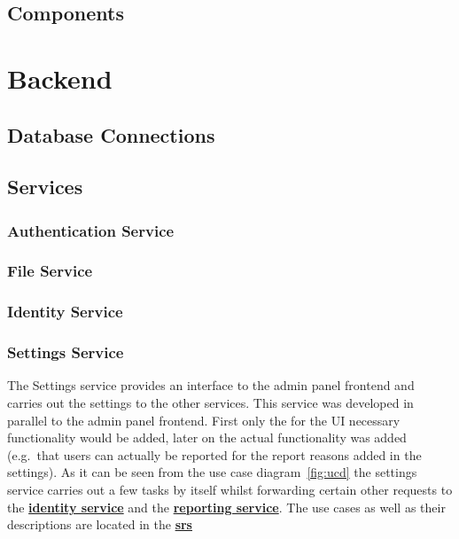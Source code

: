 \subsection{Components}


\section{Backend}

\subsection{Database Connections}

\subsection{Services}

\subsubsection{Authentication Service}

\subsubsection{File Service}

\subsubsection{Identity Service}
\label{subsubsec:identitySer}

\subsubsection{Settings Service}\label{subsubsec:settingsSer}

The Settings service provides an interface to the admin panel frontend and carries out the settings to the other
services.
This service was developed in parallel to the admin panel frontend. %
First only the for the UI necessary functionality would be added, later on the actual functionality was added
(e.g.\ that users can actually be reported for the report reasons added in the settings).
As it can be seen from the use case diagram~\ref{fig:ucd} the settings service carries out a few tasks by itself whilst
forwarding certain other requests to the \hyperref[subsubsec:identitySer]{\textbf{identity service}} and the
\hyperref[subsubsec:reportingSer]{\textbf{reporting service}}.
The use cases as well as their descriptions are located in the
\hyperref[ch:software-requirements-specification-(srs)]{\textbf{\ac{srs}}}


